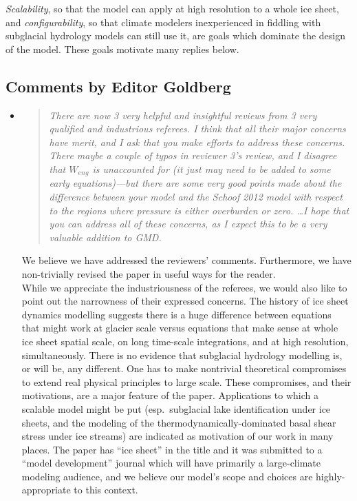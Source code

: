 \documentclass[11pt,reqno]{amsart}
\newcommand{\reply}[2]{
\medskip\medskip
\item  \begin{quote}
\emph{#1}
\end{quote}

\medskip
\noindent #2}
\begin{document}
\emph{Scalability}, so that the model can apply at high resolution to a whole ice sheet, and \emph{configurability}, so that climate modelers inexperienced in fiddling with subglacial hydrology models can still use it, are goals which dominate the design of the model.  These goals motivate many replies below.


\subsection*{Comments by Editor Goldberg}\begin{itemize}
\reply{There are now 3 very helpful and insightful reviews from 3 very qualified and industrious referees.  I think that all their major concerns have merit, and I ask that you make efforts to address these concerns.  There maybe a couple of typos in reviewer 3's review, and I disagree that $W_{eng}$ is unaccounted for (it just may need to be added to some early equations)---but there are some very good points made about the difference between your model and the Schoof 2012 model with respect to the regions where pressure is either overburden or zero. \dots I hope that you can address all of these concerns, as I expect this to be a very valuable addition to GMD.}
{We believe we have addressed the reviewers' comments.  Furthermore, we have non-trivially revised the paper in useful ways for the reader. \\
\indent While we appreciate the industriousness of the referees, we would also like to point out the narrowness of their expressed concerns.  The history of ice sheet dynamics modelling suggests there is a huge difference between equations that might work at glacier scale versus equations that make sense at whole ice sheet spatial scale, on long time-scale integrations, and at high resolution, simultaneously.  There is no evidence that subglacial hydrology modelling is, or will be, any different.  One has to make nontrivial theoretical compromises to extend real physical principles to large scale.  These compromises, and their motivations, are a major feature of the paper.  Applications to which a scalable model might be put (esp.~subglacial lake identification under ice sheets, and the modeling of the thermodynamically-dominated basal shear stress under ice streams) are indicated as motivation of our work in many places.  The paper has ``ice sheet'' in the title and it was submitted to a ``model development'' journal which will have primarily a large-climate modeling audience, and we believe our model's scope and choices are highly-appropriate to this context.}


\end{itemize}
\end{document}

